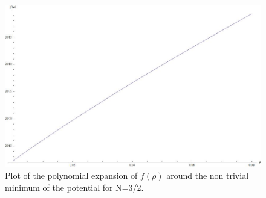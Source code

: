 \begin{figure}
\begin{center}
\includegraphics[scale=0.25]{Immagini/plotfN1.jpg}
\caption{Plot of the polynomial expansion of $f(\rho)$  around the non trivial minimum of  the potential for N=3/2.}
\label{fig:plotfN1}
\end{center}
\end{figure}








